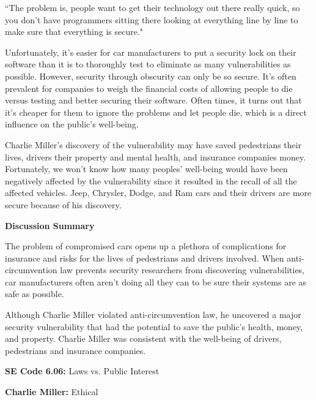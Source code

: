 \documentclass[12pt]{article}
\begin{document}
\begin{multicols}{2}
``The problem is, people want to get their technology out there really quick, so you don’t have programmers sitting there looking at everything line by line to make sure that everything is secure."\cite{insuranceRisks}

Unfortunately, it's easier for car manufacturers to put a security lock on their software than it is to thoroughly test to eliminate as many vulnerabilities as possible. \cite{chris} However, security through obscurity can only be so secure.\cite{chris} It's often prevalent for companies to weigh the financial costs of allowing people to die versus testing and better securing their software. \cite{turner} Often times, it turns out that it's cheaper for them to ignore the problems and let people die, which is a direct influence on the public's well-being. \cite{turner}

Charlie Miller's discovery of the vulnerability may have saved pedestrians their lives, drivers their property and mental health, and insurance companies money. Fortunately, we won't know how many peoples' well-being would have been negatively affected by the vulnerability since it resulted in the recall of all the affected vehicles. \cite{recall} Jeep, Chrysler, Dodge, and Ram cars and their drivers are more secure because of his discovery. \cite{recall}

\vspace{.5cm}\hspace{-.5cm}\textbf{Discussion Summary}\vspace{.2cm}

The problem of compromised cars opens up a plethora of complications for insurance and risks for the lives of pedestrians and drivers involved. When anti-circumvention law prevents security researchers from discovering vulnerabilities, car manufacturers often aren't doing all they can to be sure their systems are as safe as possible. \cite{hackingRisk}

Although Charlie Miller violated anti-circumvention law, he uncovered a major security vulnerability that had the potential to save the public's health, money, and property. Charlie Miller was consistent with the well-being of drivers, pedestrians and insurance companies.

\begin{framed}
\hspace{-.67cm}\textbf{SE Code 6.06:} Laws vs. Public Interest

\hspace{-.67cm}\textbf{Charlie Miller:} Ethical
\end{framed}



\end{multicols}
\end{document}
